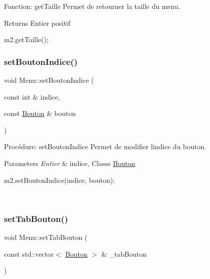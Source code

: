 Fonction\+: get\+Taille Permet de retourner la taille du menu. 

\begin{DoxyReturn}{Returns}
Entier positif 
\begin{DoxyCode}
m2.getTaille();
\end{DoxyCode}
 
\end{DoxyReturn}
\mbox{\label{classMenu_a33304f235efdcaa1f500f944f23e8762}} 
\subsubsection{\texorpdfstring{set\+Bouton\+Indice()}{setBoutonIndice()}}
{\footnotesize\ttfamily void Menu\+::set\+Bouton\+Indice (\begin{DoxyParamCaption}\item[{const int \&}]{indice,  }\item[{const \hyperlink{classBouton}{Bouton} \&}]{bouton }\end{DoxyParamCaption})}



Procédure\+: set\+Bouton\+Indice Permet de modifier l\textquotesingle{}indice du bouton\textquotesingle{}. 


\begin{DoxyParams}{Parameters}
{\em Entier} & indice, Classe \hyperlink{classBouton}{Bouton} 
\begin{DoxyCode}
m2.setBoutonIndice(indice, bouton);
\end{DoxyCode}
 \\
\hline
\end{DoxyParams}
\mbox{\label{classMenu_a45b3fe1a4d7cca82acabd3102d8bfd7c}} 
\subsubsection{\texorpdfstring{set\+Tab\+Bouton()}{setTabBouton()}}
{\footnotesize\ttfamily void Menu\+::set\+Tab\+Bouton (\begin{DoxyParamCaption}\item[{const std\+::vector$<$ \hyperlink{classBouton}{Bouton} $>$ \&}]{\+\_\+tab\+Bouton }\end{DoxyParamCaption})}



